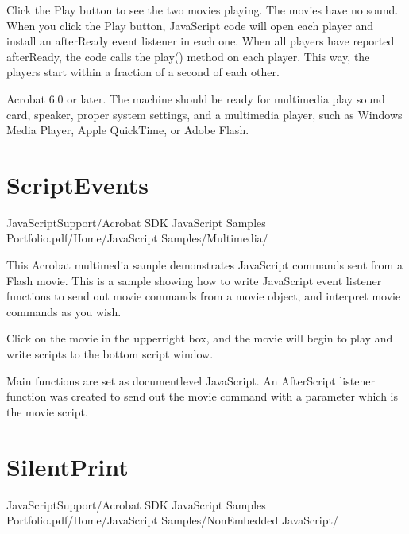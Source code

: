 \documentclass[letterpaper,12pt,english,openany,oneside]{sphinxmanual}
\begin{document}
Click the Play button to see the two movies playing. The movies have no sound. When you click the Play button, JavaScript code will open each player and install an afterReady event listener in each one. When all players have reported afterReady, the code calls the play() method on each player. This way, the players start within a fraction of a second of each other.

 Acrobat 6.0 or later. The machine should be ready for multimedia play \sphinxhyphen{} sound card, speaker, proper system settings, and a multimedia player, such as Windows Media Player, Apple QuickTime, or Adobe Flash.


\section{ScriptEvents}
\label{\detokenize{Samples_JavaScript:scriptevents}}\label{\detokenize{Samples_JavaScript:location-16}}

JavaScriptSupport/Acrobat SDK JavaScript Samples Portfolio.pdf/Home/JavaScript Samples/Multimedia/

\label{\detokenize{Samples_JavaScript:description-16}}

This Acrobat multimedia sample demonstrates JavaScript commands sent from a Flash movie. This is a sample showing how to write JavaScript event listener functions to send out movie commands from a movie object, and interpret movie commands as you wish.

Click on the movie in the upper\sphinxhyphen{}right box, and the movie will begin to play and write scripts to the bottom script window.

Main functions are set as document\sphinxhyphen{}level JavaScript. An AfterScript listener function was created to send out the movie command with a parameter which is the movie script.


\section{SilentPrint}
\label{\detokenize{Samples_JavaScript:silentprint}}\label{\detokenize{Samples_JavaScript:location-17}}

JavaScriptSupport/Acrobat SDK JavaScript Samples Portfolio.pdf/Home/JavaScript Samples/Non\sphinxhyphen{}Embedded JavaScript/
\end{document}
